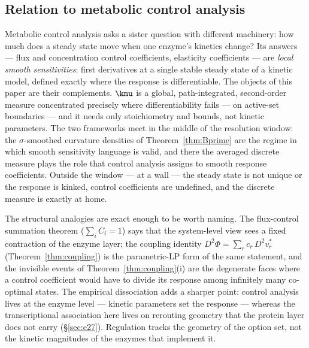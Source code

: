 \subsection{Relation to metabolic control analysis}\label{sec:mca}

Metabolic control analysis \citep{kacser1973, heinrich1974} asks a
sister question with different machinery: how much does a
steady state move when one enzyme's kinetics change? Its answers
--- flux and concentration control coefficients, elasticity
coefficients --- are \emph{local smooth sensitivities}: first
derivatives at a single stable steady state of a kinetic model,
defined exactly where the response is differentiable. The objects
of this paper are their complements. $\kmu$ is a global,
path-integrated, second-order measure concentrated precisely where
differentiability fails --- on active-set boundaries --- and it
needs only stoichiometry and bounds, not kinetic parameters. The
two frameworks meet in the middle of the resolution window: the
$\sigma$-smoothed curvature densities of Theorem~\ref{thm:Bprime}
are the regime in which smooth sensitivity language is valid, and
there the averaged discrete measure plays the role that control
analysis assigns to smooth response coefficients. Outside the
window --- at a wall --- the steady state is not unique or the
response is kinked, control coefficients are undefined, and the
discrete measure is exactly at home.

The structural analogies are exact enough to be worth naming. The
flux-control summation theorem ($\sum_i C_i = 1$) says that the
system-level view sees a fixed contraction of the enzyme layer;
the coupling identity $D^2\Phi = \sum_r c_r\,D^2 v^*_r$
(Theorem~\ref{thm:coupling}) is the parametric-LP form of the same
statement, and the invisible events of
Theorem~\ref{thm:coupling}(i) are the degenerate faces where a
control coefficient would have to divide its response among
infinitely many co-optimal states. The empirical dissociation adds
a sharper point: control analysis lives at the enzyme level ---
kinetic parameters set the response --- whereas the transcriptional
association here lives on rerouting geometry that the protein
layer does not carry (\S\ref{sec:e27}). Regulation tracks the
geometry of the option set, not the kinetic magnitudes of the
enzymes that implement it.
